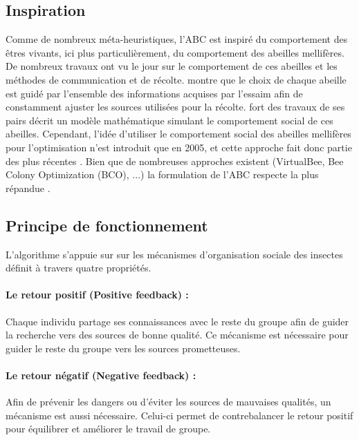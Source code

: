 \subsection{Inspiration} %
\label{sub:inspiration}
Comme de nombreux méta-heuristiques, l’ABC est inspiré du comportement des êtres
vivants, ici plus particulièrement, du comportement des abeilles mellifères. De nombreux
travaux ont vu le jour sur le comportement de ces abeilles et les méthodes de
communication et de récolte. \cite{Visscher19821790} montre que le choix de chaque abeille
est guidé par l’ensemble des informations acquises par l’essaim afin de constamment
ajuster les sources utilisées pour la récolte.
\cite{Camazine1991547} fort des travaux de ses pairs décrit un modèle mathématique
simulant le comportement social de ces abeilles.
Cependant, l’idée d’utiliser le comportement social des abeilles mellifères pour l’optimisation
n’est introduit que en 2005, et cette approche fait donc partie des plus récentes \parencite{Karaboga2005}.
Bien que de nombreuses approches existent (VirtualBee, Bee Colony Optimization (BCO), ...)
la formulation de l’ABC respecte la plus répandue \parencite{Karaboga201221}.


\subsection{Principe de fonctionnement} %
\label{sub:principe_de_fonctionnement}
L’algorithme s’appuie sur sur les mécanismes d’organisation sociale des insectes \parencite{Bonabeau1999}
définit à travers quatre propriétés.

\paragraph{Le retour positif (Positive feedback) :} %
\label{par:positive_feedback}
Chaque individu partage ses connaissances avec le reste du groupe afin de guider
la recherche vers des sources de bonne qualité. Ce mécanisme est nécessaire pour
guider le reste du groupe vers les sources prometteuses.

\paragraph{Le retour négatif (Negative feedback) :} %
\label{par:negative_feedback}
Afin de prévenir les dangers ou d’éviter les sources de mauvaises qualités, un mécanisme est
aussi nécessaire. Celui-ci permet de contrebalancer le retour positif pour équilibrer
et améliorer le travail de groupe.

